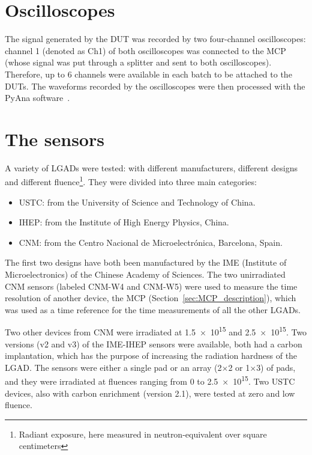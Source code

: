 \section{Oscilloscopes}
The signal generated by the DUT was recorded by two four-channel oscilloscopes: channel 1 (denoted as Ch1) of both oscilloscopes was connected to the MCP (whose signal was put through a splitter and sent to both oscilloscopes). Therefore, up to 6 channels were available in each batch to be attached to the DUTs.
The waveforms recorded by the oscilloscopes were then processed with the PyAna software~\cite{atlas_hgtd_pyana_2025}. 


\section{The sensors}\label{sec:the_sensors}
A variety of LGADs were tested: with different manufacturers, different designs and different fluence\footnote{Radiant exposure, here measured in neutron-equivalent over square centimeters}. They were divided into three main categories:
\begin{itemize}
    \item USTC: from the University of Science and Technology of China.
    \item IHEP: from the Institute of High Energy Physics, China.
    \item CNM: from the Centro Nacional de Microelectr\'onica, Barcelona, Spain.
\end{itemize}

The first two designs have both been manufactured by the IME (Institute of Microelectronics) of the Chinese Academy of Sciences. The two unirradiated CNM sensors (labeled CNM-W4 and CNM-W5) were used to measure the time resolution of another device, the MCP (Section~\ref{sec:MCP_description}), which was used as a time reference for the time measurements of all the other LGADs. 

Two other devices from CNM were irradiated at \qty{1.5e15}{\neutroneq} and \qty{2.5e15}{\neutroneq}. Two versions (v2 and v3) of the IME-IHEP sensors were available, both had a carbon implantation, which has the purpose of increasing the radiation hardness of the LGAD. The sensors were either a single pad or an array (2\(\times\)2 or 1\(\times\)3) of pads, and they were irradiated at fluences ranging from \(0\) to \qty{2.5e15}{\neutroneq}. Two USTC devices, also with carbon enrichment (version 2.1), were tested at zero and low fluence. 

